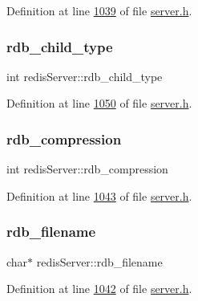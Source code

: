 Definition at line \hyperlink{server_8h_source_l01039}{1039} of file \hyperlink{server_8h_source}{server.\+h}.

\mbox{\label{structredisServer_a78db06fa0584c88619d7d2cdd11eb0d8}} 
\subsubsection{\texorpdfstring{rdb\+\_\+child\+\_\+type}{rdb\_child\_type}}
{\footnotesize\ttfamily int redis\+Server\+::rdb\+\_\+child\+\_\+type}



Definition at line \hyperlink{server_8h_source_l01050}{1050} of file \hyperlink{server_8h_source}{server.\+h}.

\mbox{\label{structredisServer_a87cec4260eb30086b1c63096c4aac520}} 
\subsubsection{\texorpdfstring{rdb\+\_\+compression}{rdb\_compression}}
{\footnotesize\ttfamily int redis\+Server\+::rdb\+\_\+compression}



Definition at line \hyperlink{server_8h_source_l01043}{1043} of file \hyperlink{server_8h_source}{server.\+h}.

\mbox{\label{structredisServer_a9619434e5407d2ca6fb247f47fc3405d}} 
\subsubsection{\texorpdfstring{rdb\+\_\+filename}{rdb\_filename}}
{\footnotesize\ttfamily char$\ast$ redis\+Server\+::rdb\+\_\+filename}



Definition at line \hyperlink{server_8h_source_l01042}{1042} of file \hyperlink{server_8h_source}{server.\+h}.

